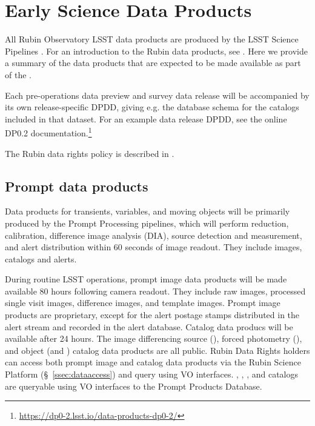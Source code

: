 \section{Early Science Data Products}
\label{sec:data}

All Rubin Observatory LSST data products are produced by the LSST Science Pipelines \cite{2019ASPC..523..521B,2018PASJ...70S...5B}. 
For an introduction to the Rubin data products, see \citet{RubinDataProductsAbridged}.
Here we provide a summary of the data products that are expected to be made available as part of the \esp.

Each pre-operations data preview and survey data release will be accompanied by its own release-specific DPDD, giving e.g. the  database schema for the catalogs included in that dataset.
For an example data release DPDD, see the online DP0.2 documentation.\footnote{\url{https://dp0-2.lsst.io/data-products-dp0-2/}}

The Rubin data rights policy is described in  \cite{RDO-013}.

\subsection{Prompt data products}

Data products for transients, variables, and moving objects will be primarily produced by the Prompt Processing pipelines, which will perform reduction, calibration, difference image analysis (DIA), source detection and measurement, and alert distribution within 60 seconds of image readout. 
They include images, catalogs and alerts. 

During routine LSST operations, prompt image data products will be made available 80 hours following camera readout. 
They include raw images, processed single visit images, difference images, and template images. 
Prompt image products are proprietary, except for the alert postage stamps distributed in the alert stream and recorded in the alert database.
Catalog data producs will be available after 24 hours. 
The image differencing source (\DIASource), forced photometry (\DIAForcedSource), and object (\DIAObject and \SSObject)
catalog data products are all public. 
Rubin Data Rights holders can access both prompt image and catalog data products via the Rubin Science Platform (\S~\ref{ssec:dataaccess}) and query using VO interfaces. 
\DIASource, \DIAForcedSource, \DIAObject, and \SSObject catalogs are queryable using VO interfaces to the Prompt Products Database.

